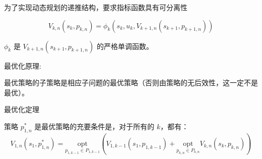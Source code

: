 \documentclass[12pt, a4paper, oneside, UTF8]{ctexbook}
\begin{document}
为了实现动态规划的递推结构，要求指标函数具有可分离性

$$
V_{k,n}(s_k, p_{k,n}) = \phi_k(s_k, u_k, V_{k+1,n}(s_{k+1}, p_{k+1,n}))
$$

$\phi_k$ 是 $V_{k+1,n}(s_{k+1}, p_{k+1,n})$ 的严格单调函数。

\begin{remark}
    最优化原理:

最优策略的子策略是相应子问题的最优策略（否则由策略的无后效性，这一定不是最优）。
\end{remark}

\begin{theorem}
    最优化定理

策略 $p_{1,n}^*$ 是最优策略的充要条件是，对于所有的 $k$，都有：
$$ V_{1,n}(s_1, p_{1,n}^*) = \underset{p_{1,k-1} \in P_{1,k-1}}{\text{opt}} \left( V_{1,k-1}(s_1, p_{1,k-1}) + \underset{p_{k,n} \in P_{k,n}}{\text{opt}} V_{k,n}(s_k, p_{k,n}) \right) $$
\end{theorem}




\ifx\allfiles\undefined
\end{document}
